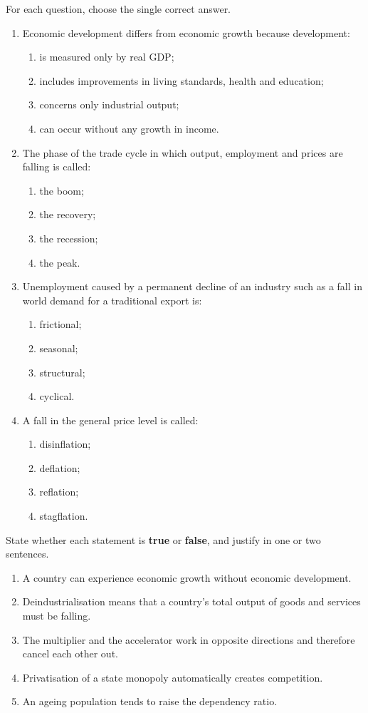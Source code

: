 \documentclass[11pt]{article}
\begin{document}
\begin{exercice}
For each question, choose the single correct answer.
\begin{enumerate}
\item Economic development differs from economic growth because development:
\begin{enumerate}
\item is measured only by real GDP;
\item includes improvements in living standards, health and education;
\item concerns only industrial output;
\item can occur without any growth in income.
\end{enumerate}
\item The phase of the trade cycle in which output, employment and prices are falling is called:
\begin{enumerate}
\item the boom; \item the recovery; \item the recession; \item the peak.
\end{enumerate}
\item Unemployment caused by a permanent decline of an industry such as a fall in world demand for a traditional export is:
\begin{enumerate}
\item frictional; \item seasonal; \item structural; \item cyclical.
\end{enumerate}
\item A fall in the general price level is called:
\begin{enumerate}
\item disinflation; \item deflation; \item reflation; \item stagflation.
\end{enumerate}
\end{enumerate}
\end{exercice}

\begin{exercice}
State whether each statement is \textbf{true} or \textbf{false}, and justify in one or two sentences.
\begin{enumerate}
\item A country can experience economic growth without economic development.
\item Deindustrialisation means that a country's total output of goods and services must be falling.
\item The multiplier and the accelerator work in opposite directions and therefore cancel each other out.
\item Privatisation of a state monopoly automatically creates competition.
\item An ageing population tends to raise the dependency ratio.
\end{enumerate}
\end{exercice}
\end{document}
